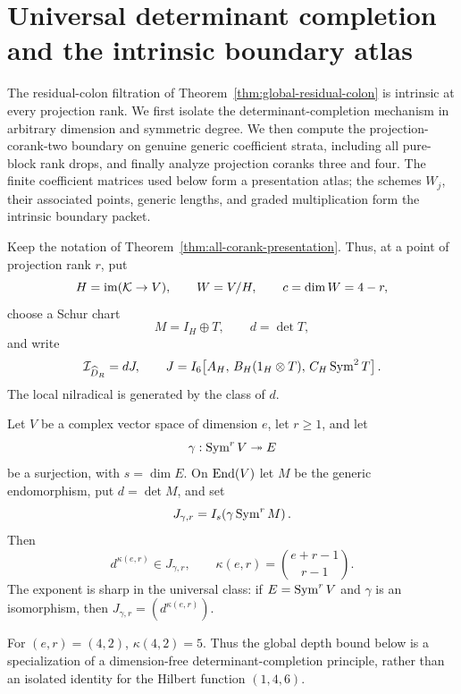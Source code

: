 \section{Universal determinant completion and the intrinsic boundary atlas}
\label{sec:boundary-atlas-statement}

The residual-colon filtration of
Theorem~\ref{thm:global-residual-colon} is intrinsic at every
projection rank.  We first isolate the determinant-completion
mechanism in arbitrary dimension and symmetric degree.  We then
compute the projection-corank-two boundary on genuine generic
coefficient strata, including all pure-block rank drops, and finally
analyze projection coranks three and four.  The finite coefficient
matrices used below form a presentation atlas; the schemes \(W_j\),
their associated points, generic lengths, and graded multiplication
form the intrinsic boundary packet.

Keep the notation of
Theorem~\ref{thm:all-corank-presentation}.  Thus, at a point of
projection rank \(r\), put
\[
 H=\operatorname{im}(\mathcal K\to V),\qquad W=V/H,\qquad c=\dim W=4-r,
\]
choose a Schur chart
\[
 M=I_H\oplus T,\qquad d=\det T,
\]
and write
\begin{equation}\label{eq:atlas-residual-J}
 \mathcal I_{\widehat D_R}=dJ,\qquad
 J=I_6\!\left[
 A_H,\,
 B_H(1_H\otimes T),\,
 C_H\operatorname{Sym}^2T
 \right].
\end{equation}
The local nilradical is generated by the class of \(d\).

\begin{theorem}
\label{thm:universal-det-completion}
Let \(V\) be a complex vector space of dimension \(e\), let
\(r\ge1\), and let
\[
 \gamma:\operatorname{Sym}^rV\twoheadrightarrow E
\]
be a surjection, with \(s=\dim E\).  On \(\operatorname{End}(V)\) let \(M\)
be the generic endomorphism, put \(d=\det M\), and set
\[
 J_{\gamma,r}=I_s\!\left(\gamma\operatorname{Sym}^rM\right).
\]
Then
\begin{equation}\label{eq:universal-det-completion}
 d^{\kappa(e,r)}\in J_{\gamma,r},\qquad
 \kappa(e,r)=\binom{e+r-1}{r-1}.
\end{equation}
The exponent is sharp in the universal class: if
\(E=\operatorname{Sym}^rV\) and \(\gamma\) is an isomorphism, then
\(J_{\gamma,r}=(d^{\kappa(e,r)})\).
\end{theorem}

For \((e,r)=(4,2)\),
\(\kappa(4,2)=5\).  Thus the global depth bound below is a
specialization of a dimension-free determinant-completion principle,
rather than an isolated identity for the Hilbert function
\((1,4,6)\).

